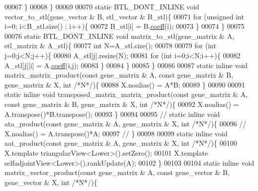 \begin{DoxyCode}
00067     \}
00068   \}
00069 
00070   \textcolor{keyword}{static} BTL\_DONT\_INLINE  \textcolor{keywordtype}{void} vector\_to\_stl(gene\_vector & B, stl\_vector & B\_stl)\{
00071     \textcolor{keywordflow}{for} (\textcolor{keywordtype}{unsigned} \textcolor{keywordtype}{int} i=0; i<B\_stl.size() ; i++)\{
00072       B\_stl[i] = B.\hyperlink{class_eigen_1_1_plain_object_base_afbfc12954f16d21aedb7bd839f64a278}{coeff}(i);
00073     \}
00074   \}
00075 
00076   \textcolor{keyword}{static} BTL\_DONT\_INLINE  \textcolor{keywordtype}{void} matrix\_to\_stl(gene\_matrix & A, stl\_matrix & A\_stl)\{
00077     \textcolor{keywordtype}{int}  N=A\_stl.size();
00078 
00079     \textcolor{keywordflow}{for} (\textcolor{keywordtype}{int} j=0;j<N;j++)\{
00080       A\_stl[j].resize(N);
00081       \textcolor{keywordflow}{for} (\textcolor{keywordtype}{int} i=0;i<N;i++)\{
00082         A\_stl[j][i] = A.\hyperlink{class_eigen_1_1_plain_object_base_afbfc12954f16d21aedb7bd839f64a278}{coeff}(i,j);
00083       \}
00084     \}
00085   \}
00086 
00087   \textcolor{keyword}{static} \textcolor{keyword}{inline} \textcolor{keywordtype}{void} matrix\_matrix\_product(\textcolor{keyword}{const} gene\_matrix & A, \textcolor{keyword}{const} gene\_matrix & B, gene\_matrix & X, \textcolor{keywordtype}{
      int}  \textcolor{comment}{/*N*/})\{
00088     X.noalias() = A*B;
00089   \}
00090 
00091   \textcolor{keyword}{static} \textcolor{keyword}{inline} \textcolor{keywordtype}{void} transposed\_matrix\_matrix\_product(\textcolor{keyword}{const} gene\_matrix & A, \textcolor{keyword}{const} gene\_matrix & B, 
      gene\_matrix & X, \textcolor{keywordtype}{int}  \textcolor{comment}{/*N*/})\{
00092     X.noalias() = A.transpose()*B.transpose();
00093   \}
00094 
00095 \textcolor{comment}{//   static inline void ata\_product(const gene\_matrix & A, gene\_matrix & X, int  /*N*/)\{}
00096 \textcolor{comment}{//     X.noalias() = A.transpose()*A;}
00097 \textcolor{comment}{//   \}}
00098 
00099   \textcolor{keyword}{static} \textcolor{keyword}{inline} \textcolor{keywordtype}{void} aat\_product(\textcolor{keyword}{const} gene\_matrix & A, gene\_matrix & X, \textcolor{keywordtype}{int}  \textcolor{comment}{/*N*/})\{
00100     X.template triangularView<Lower>().setZero();
00101     X.template selfadjointView<Lower>().rankUpdate(A);
00102   \}
00103 
00104   \textcolor{keyword}{static} \textcolor{keyword}{inline} \textcolor{keywordtype}{void} matrix\_vector\_product(\textcolor{keyword}{const} gene\_matrix & A, \textcolor{keyword}{const} gene\_vector & B, gene\_vector & X, \textcolor{keywordtype}{
      int}  \textcolor{comment}{/*N*/})\{

\end{DoxyCode}
